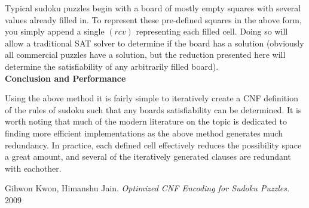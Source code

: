 \documentclass[11pt]{article}
\begin{document}
Typical sudoku puzzles begin with a board of mostly empty squares with several values already filled in. To represent these pre-defined squares in the above form, you simply append a single $(rcv)$ representing each filled cell. Doing so will allow a traditional SAT solver to determine if the board has a solution (obviously all commercial puzzles have a solution, but the reduction presented here will determine the satisfiability of any arbitrarily filled board).\\

\textbf{Conclusion and Performance}

Using the above method it is fairly simple to iteratively create a CNF definition of the rules of sudoku such that any boards satisfiability can be determined. It is worth noting that much of the modern literature on the topic is dedicated to finding more efficient implementations as the above method generates much redundancy. In practice, each defined cell effectively reduces the possibility space a great amount, and several of the iteratively generated clauses are redundant with eachother.




\begin{thebibliography}{9}
Gihwon Kwon, Himanshu Jain. \textit{Optimized CNF Encoding for Sudoku Puzzles.} 2009
\end{thebibliography}
\end{document}
